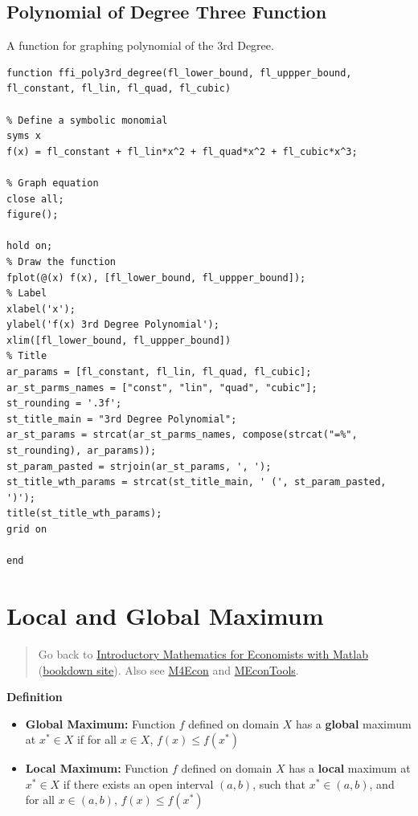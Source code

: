 \documentclass[
]{book}
\begin{document}
\hypertarget{polynomial-of-degree-three-function}{%
\subsection{Polynomial of Degree Three Function}\label{polynomial-of-degree-three-function}}

A function for graphing polynomial of the 3rd Degree.

\begin{verbatim}
function ffi_poly3rd_degree(fl_lower_bound, fl_uppper_bound, fl_constant, fl_lin, fl_quad, fl_cubic)

% Define a symbolic monomial
syms x
f(x) = fl_constant + fl_lin*x^2 + fl_quad*x^2 + fl_cubic*x^3;

% Graph equation
close all;
figure();

hold on;
% Draw the function
fplot(@(x) f(x), [fl_lower_bound, fl_uppper_bound]);
% Label
xlabel('x');
ylabel('f(x) 3rd Degree Polynomial');
xlim([fl_lower_bound, fl_uppper_bound])
% Title
ar_params = [fl_constant, fl_lin, fl_quad, fl_cubic];
ar_st_parms_names = ["const", "lin", "quad", "cubic"];
st_rounding = '.3f';
st_title_main = "3rd Degree Polynomial";
ar_st_params = strcat(ar_st_parms_names, compose(strcat("=%", st_rounding), ar_params));
st_param_pasted = strjoin(ar_st_params, ', ');
st_title_wth_params = strcat(st_title_main, ' (', st_param_pasted, ')');
title(st_title_wth_params);
grid on

end
\end{verbatim}

\hypertarget{local-and-global-maximum}{%
\section{Local and Global Maximum}\label{local-and-global-maximum}}

\begin{quote}
Go back to \href{https://math4econ.github.io/}{Introductory Mathematics for Economists with Matlab} (\href{https://math4econ.github.io/bookdown}{bookdown site}). Also see \href{http://fanwangecon.github.io/M4Econ}{M4Econ} and \href{https://fanwangecon.github.io/MEconTools/}{MEconTools}.
\end{quote}

\textbf{Definition}

\begin{itemize}
\item
  \textbf{Global Maximum:} Function \(f\) defined on domain \(X\) has a
  \textbf{global} maximum at \(x^* \in X\) if for all \(x\in X\),
  \(f(x)\le f(x^* )\)
\item
  \textbf{Local Maximum:} Function \(f\) defined on domain \(X\) has a
  \textbf{local} maximum at \(x^* \in X\) if there exists an open interval
  \(\left(a,b\right)\), such that \(x^* \in \left(a,b\right)\), and for
  all \(x\in \left(a,b\right)\), \(f(x)\le f(x^* )\)
\end{itemize}
\end{document}
